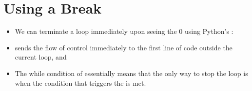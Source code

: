 \documentclass[letterpaper,10pt,english]{sphinxmanual}
\begin{document}
\section{Using a Break}
\label{\detokenize{lecture_notes/lec12_loops2_for_double:using-a-break}}\begin{itemize}
\item {} 
We can terminate a loop immediately upon seeing the 0 using
Python’s :

%
\begin{sphinxVerbatim}[commandchars=\\\{\}]
  
 
      
       
      

\end{sphinxVerbatim}

\item {} 
 sends the flow of control immediately to the first line of code
outside the current loop, and

\item {} 
The while condition of  essentially means that the only way
to stop the loop is when the condition that triggers the  is
met.

\end{itemize}
\end{document}
